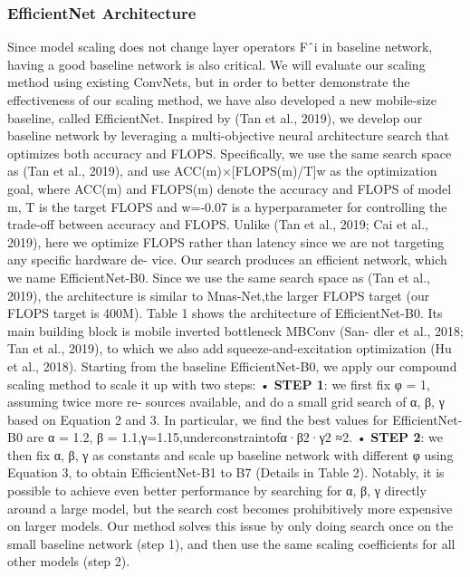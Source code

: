 \documentclass[
]{krantz}
\begin{document}
\hypertarget{efficientnet-architecture}{%
\subsubsection{EfficientNet Architecture}\label{efficientnet-architecture}}

Since model scaling does not change layer operators Fˆi in baseline network, having a good baseline network is also critical. We will evaluate our scaling method using existing ConvNets, but in order to better demonstrate the effectiveness of our scaling method, we have also developed a new mobile-size baseline, called EfficientNet.
Inspired by (Tan et al., 2019), we develop our baseline network by leveraging a multi-objective neural architecture search that optimizes both accuracy and FLOPS. Specifically, we use the same search space as (Tan et al., 2019), and use ACC(m)×{[}FLOPS(m)/T{]}w as the optimization goal, where ACC(m) and FLOPS(m) denote the accuracy and FLOPS of model m, T is the target FLOPS and w=-0.07 is a hyperparameter for controlling the trade-off between accuracy and FLOPS. Unlike (Tan et al., 2019; Cai et al., 2019), here we optimize FLOPS rather than latency since we are not targeting any specific hardware de- vice. Our search produces an efficient network, which we name EfficientNet-B0. Since we use the same search space as (Tan et al., 2019), the architecture is similar to Mnas-Net,the larger FLOPS target (our FLOPS target is 400M). Table 1 shows the architecture of EfficientNet-B0. Its main building block is mobile inverted bottleneck MBConv (San- dler et al., 2018; Tan et al., 2019), to which we also add squeeze-and-excitation optimization (Hu et al., 2018).
Starting from the baseline EfficientNet-B0, we apply our compound scaling method to scale it up with two steps:
• \textbf{STEP 1}: we first fix φ = 1, assuming twice more re- sources available, and do a small grid search of α, β, γ based on Equation 2 and 3. In particular, we find the best values for EfficientNet-B0 are α = 1.2, β = 1.1,γ=1.15,underconstraintofα·β2·γ2 ≈2.
• \textbf{STEP 2}: we then fix α, β, γ as constants and scale up baseline network with different φ using Equation 3, to obtain EfficientNet-B1 to B7 (Details in Table 2).
Notably, it is possible to achieve even better performance by searching for α, β, γ directly around a large model, but the search cost becomes prohibitively more expensive on larger models. Our method solves this issue by only doing search once on the small baseline network (step 1), and then use the same scaling coefficients for all other models (step 2).
\end{document}
